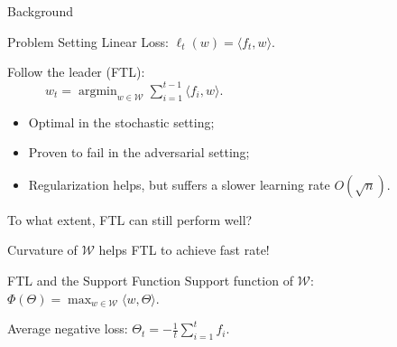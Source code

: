 \documentclass[final]{beamer} %
\newcommand{\cW}{\mathcal{W}}
\newcommand{\lt}{\ell_t}
\newcommand{\ip}[1]{\langle#1\rangle}
\DeclareMathOperator*{\argmin}{argmin}
\begin{document}
\begin{frame}[c]
\begin{columns}[t,totalwidth=\textwidth]
\begin{column}{.32\textwidth}
\begin{block}{Background}
		\end{block}
		\begin{block}{Problem Setting}
		{\centering Linear Loss: $\lt(w) = \ip{f_t, w}$}.
		\begin{minipage}{.9\linewidth}
			\begin{block}{}
				\vspace{-2cm}
		 		\begin{tcolorbox}[title filled,colbacktitle=uofagreen!5, coltitle = black, width = 0.9\textwidth, colback = uofagreen!10, colframe = red,arc = 16pt]
			 		Follow the leader (FTL):\\
			 		$\quad \quad \quad w_t = \argmin_{w\in \cW} \sum_{i=1}^{t-1} \ip{f_i,w}.$
		 		\end{tcolorbox}	
			 	\begin{itemize}
			 		\item Optimal in the stochastic setting;
			 		\item Proven to fail in the adversarial setting;
			 		\item Regularization helps, but suffers a slower learning rate $O(\sqrt{n})$.
			 	\end{itemize}
			\end{block}
		\end{minipage}

		 \vspace{1cm}
	 	{\large \alert{To what extent, FTL can still perform well?}}
	 	\vspace{1cm}
	 	\begin{tcolorbox}[title = \vspace{0.4cm}\textbf{\large Our contribution} \vspace{0.4cm}, title filled, width = 0.9\textwidth, colback = uofagreen!10, colframe = red, arc = 16pt]
	 		Curvature of $\cW$ helps FTL to achieve fast rate!
	 	\end{tcolorbox}
		\end{block}

	
		\begin{block}{FTL and the Support Function}
			Support function of $\cW$:
			\qquad $
			\Phi(\Theta) = \max_{w\in\cW} \ip{w, \Theta}.
			$
			\medskip
			
			Average negative loss:
			\qquad \quad$\displaystyle
			\Theta_t = -\frac1t \sum_{i=1}^t f_i.
			$
			

\end{block}
\end{column}
\end{columns}
\end{frame}
\end{document}
